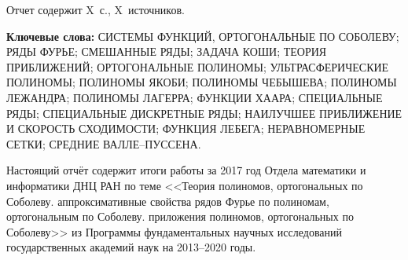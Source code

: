 \Referat %

Отчет содержит X~с., X~источников.

 \bigskip
 \textbf{ Ключевые
  слова:}
  СИСТЕМЫ ФУНКЦИЙ, ОРТОГОНАЛЬНЫЕ ПО СОБОЛЕВУ; РЯДЫ ФУРЬЕ; СМЕШАННЫЕ РЯДЫ; ЗАДАЧА КОШИ;
  ТЕОРИЯ ПРИБЛИЖЕНИЙ; ОРТОГОНАЛЬНЫЕ ПОЛИНОМЫ; УЛЬТРАСФЕРИЧЕСКИЕ ПОЛИНОМЫ; ПОЛИНОМЫ ЯКОБИ; ПОЛИНОМЫ ЧЕБЫШЕВА; ПОЛИНОМЫ ЛЕЖАНДРА; ПОЛИНОМЫ ЛАГЕРРА; ФУНКЦИИ ХААРА; СПЕЦИАЛЬНЫЕ РЯДЫ; СПЕЦИАЛЬНЫЕ ДИСКРЕТНЫЕ РЯДЫ; НАИЛУЧШЕЕ ПРИБЛИЖЕНИЕ И СКОРОСТЬ СХОДИМОСТИ; ФУНКЦИЯ ЛЕБЕГА; НЕРАВНОМЕРНЫЕ СЕТКИ; СРЕДНИЕ ВАЛЛЕ--ПУССЕНА.

 \bigskip

Настоящий отчёт содержит итоги работы за 2017 год Отдела математики и информатики ДНЦ РАН по теме
<<Теория полиномов, ортогональных по Соболеву. аппроксимативные свойства рядов Фурье по полиномам, ортогональным по Соболеву. приложения полиномов,  ортогональных по Соболеву>>
из Программы фундаментальных научных исследований государственных академий наук на 2013–2020 годы.




